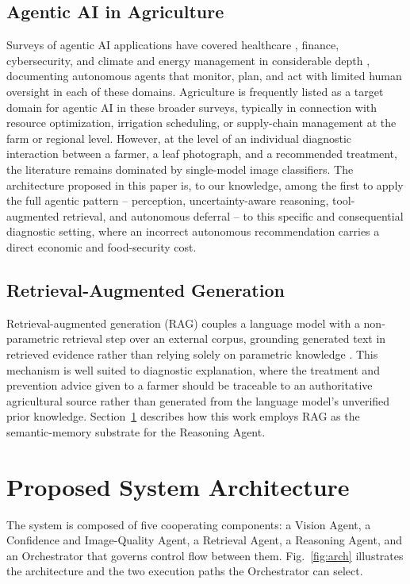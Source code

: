 \documentclass[conference]{IEEEtran}
\begin{document}
\subsection{Agentic AI in Agriculture}
Surveys of agentic AI applications have covered healthcare \cite{b11,b1}, finance, cybersecurity, and climate and energy management in considerable depth \cite{b2,b6,b13}, documenting autonomous agents that monitor, plan, and act with limited human oversight in each of these domains. Agriculture is frequently listed as a target domain for agentic AI in these broader surveys, typically in connection with resource optimization, irrigation scheduling, or supply-chain management at the farm or regional level. However, at the level of an individual diagnostic interaction between a farmer, a leaf photograph, and a recommended treatment, the literature remains dominated by single-model image classifiers. The architecture proposed in this paper is, to our knowledge, among the first to apply the full agentic pattern -- perception, uncertainty-aware reasoning, tool-augmented retrieval, and autonomous deferral -- to this specific and consequential diagnostic setting, where an incorrect autonomous recommendation carries a direct economic and food-security cost.

\subsection{Retrieval-Augmented Generation}
Retrieval-augmented generation (RAG) couples a language model with a non-parametric retrieval step over an external corpus, grounding generated text in retrieved evidence rather than relying solely on parametric knowledge \cite{r_lewis2020}. This mechanism is well suited to diagnostic explanation, where the treatment and prevention advice given to a farmer should be traceable to an authoritative agricultural source rather than generated from the language model's unverified prior knowledge. Section~\ref{sec:arch} describes how this work employs RAG as the semantic-memory substrate for the Reasoning Agent.

\section{Proposed System Architecture}
\label{sec:arch}

The system is composed of five cooperating components: a Vision Agent, a Confidence and Image-Quality Agent, a Retrieval Agent, a Reasoning Agent, and an Orchestrator that governs control flow between them. Fig.~\ref{fig:arch} illustrates the architecture and the two execution paths the Orchestrator can select.
\end{document}
